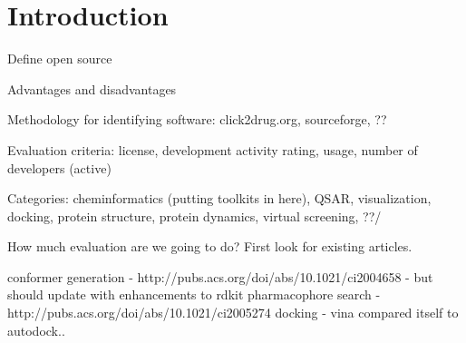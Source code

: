\section*{Introduction}

Define open source

Advantages and disadvantages

Methodology for identifying software: click2drug.org, sourceforge, ??

Evaluation criteria: license, development activity rating, usage, number of developers (active)

Categories:
 cheminformatics (putting toolkits in here), QSAR, visualization, docking, protein structure, protein dynamics, virtual screening, ??/
 
 
 How much evaluation are we going to do?  First look for existing articles.
 
 conformer generation - http://pubs.acs.org/doi/abs/10.1021/ci2004658 - but should update with enhancements to rdkit
 pharmacophore search - http://pubs.acs.org/doi/abs/10.1021/ci2005274
 docking - vina compared itself to autodock..
  
  